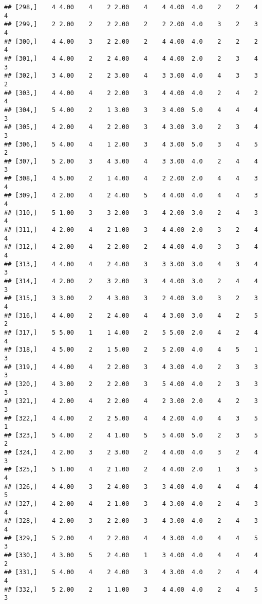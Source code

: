 \documentclass[]{article}
\begin{document}
\begin{verbatim}
## [298,]    4 4.00    4    2 2.00    4    4 4.00  4.0    2    2    4    4
## [299,]    2 2.00    2    2 2.00    2    2 2.00  4.0    3    2    3    4
## [300,]    4 4.00    3    2 2.00    2    4 4.00  4.0    2    2    2    4
## [301,]    4 4.00    2    2 4.00    4    4 4.00  2.0    2    3    4    3
## [302,]    3 4.00    2    2 3.00    4    3 3.00  4.0    4    3    3    2
## [303,]    4 4.00    4    2 2.00    3    4 4.00  4.0    2    4    2    4
## [304,]    5 4.00    2    1 3.00    3    3 4.00  5.0    4    4    4    3
## [305,]    4 2.00    4    2 2.00    3    4 3.00  3.0    2    3    4    3
## [306,]    5 4.00    4    1 2.00    3    4 3.00  5.0    3    4    5    2
## [307,]    5 2.00    3    4 3.00    4    3 3.00  4.0    2    4    4    3
## [308,]    4 5.00    2    1 4.00    4    2 2.00  2.0    4    4    3    4
## [309,]    4 2.00    4    2 4.00    5    4 4.00  4.0    4    4    3    4
## [310,]    5 1.00    3    3 2.00    3    4 2.00  3.0    2    4    3    4
## [311,]    4 2.00    4    2 1.00    3    4 4.00  2.0    3    2    4    4
## [312,]    4 2.00    4    2 2.00    2    4 4.00  4.0    3    3    4    4
## [313,]    4 4.00    4    2 4.00    3    3 3.00  3.0    4    3    4    3
## [314,]    4 2.00    2    3 2.00    3    4 4.00  3.0    2    4    4    3
## [315,]    3 3.00    2    4 3.00    3    2 4.00  3.0    3    2    3    4
## [316,]    4 4.00    2    2 4.00    4    4 3.00  3.0    4    2    5    2
## [317,]    5 5.00    1    1 4.00    2    5 5.00  2.0    4    2    4    4
## [318,]    4 5.00    2    1 5.00    2    5 2.00  4.0    4    5    1    3
## [319,]    4 4.00    4    2 2.00    3    4 3.00  4.0    2    3    3    3
## [320,]    4 3.00    2    2 2.00    3    5 4.00  4.0    2    3    3    3
## [321,]    4 2.00    4    2 2.00    4    2 3.00  2.0    4    2    3    3
## [322,]    4 4.00    2    2 5.00    4    4 2.00  4.0    4    3    5    1
## [323,]    5 4.00    2    4 1.00    5    5 4.00  5.0    2    3    5    2
## [324,]    4 2.00    3    2 3.00    2    4 4.00  4.0    3    2    4    3
## [325,]    5 1.00    4    2 1.00    2    4 4.00  2.0    1    3    5    4
## [326,]    4 4.00    3    2 4.00    3    3 4.00  4.0    4    4    4    5
## [327,]    4 2.00    4    2 1.00    3    4 3.00  4.0    2    4    3    4
## [328,]    4 2.00    3    2 2.00    3    4 3.00  4.0    2    4    3    4
## [329,]    5 2.00    4    2 2.00    4    4 3.00  4.0    4    4    5    3
## [330,]    4 3.00    5    2 4.00    1    3 4.00  4.0    4    4    4    2
## [331,]    5 4.00    4    2 4.00    3    4 3.00  4.0    2    4    4    4
## [332,]    5 2.00    2    1 1.00    3    4 4.00  4.0    2    4    5    3

\end{verbatim}
\end{document}

